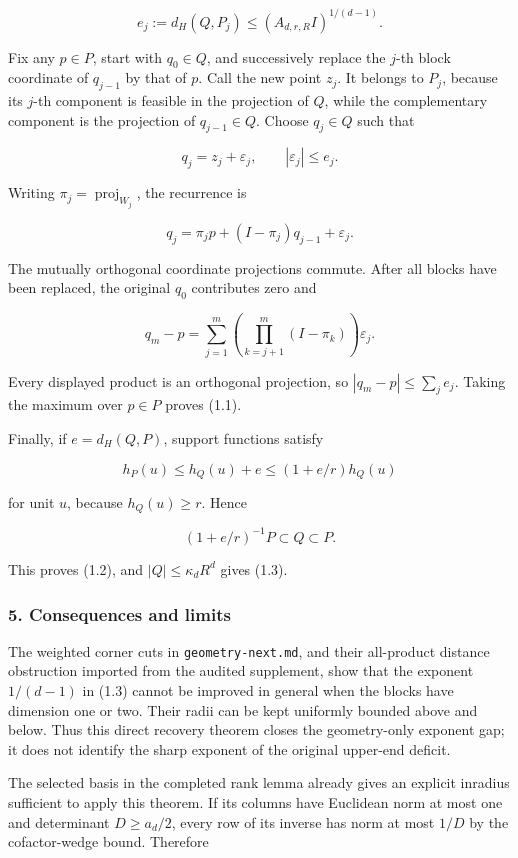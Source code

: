 \documentclass[
  11pt,
]{article}
\begin{document}
\[
 e_j:=d_H(Q,P_j)\le(A_{d,r,R}I)^{1/(d-1)}.            \tag{4.1}
\]

Fix any \(p\in P\), start with \(q_0\in Q\), and successively replace
the \(j\)-th block coordinate of \(q_{j-1}\) by that of \(p\). Call the
new point \(z_j\). It belongs to \(P_j\), because its \(j\)-th component
is feasible in the projection of \(Q\), while the complementary
component is the projection of \(q_{j-1}\in Q\). Choose \(q_j\in Q\)
such that

\[
 q_j=z_j+\varepsilon_j,\qquad |\varepsilon_j|\le e_j.
\]

Writing \(\pi_j=\operatorname{proj}_{W_j}\), the recurrence is

\[
 q_j=\pi_jp+(I-\pi_j)q_{j-1}+\varepsilon_j.
\]

The mutually orthogonal coordinate projections commute. After all blocks
have been replaced, the original \(q_0\) contributes zero and

\[
 q_m-p=\sum_{j=1}^m
       \left(\prod_{k=j+1}^m(I-\pi_k)\right)\varepsilon_j.
\]

Every displayed product is an orthogonal projection, so
\(|q_m-p|\le\sum_j e_j\). Taking the maximum over \(p\in P\) proves
(1.1).

Finally, if \(e=d_H(Q,P)\), support functions satisfy

\[
 h_P(u)\le h_Q(u)+e\le(1+e/r)h_Q(u)
\]

for unit \(u\), because \(h_Q(u)\ge r\). Hence

\[
 (1+e/r)^{-1}P\subset Q\subset P.
\]

This proves (1.2), and \(|Q|\le\kappa_dR^d\) gives (1.3).

\subsubsection{5. Consequences and
limits}\label{consequences-and-limits}

The weighted corner cuts in \texttt{geometry-next.md}, and their
all-product distance obstruction imported from the audited supplement,
show that the exponent \(1/(d-1)\) in (1.3) cannot be improved in
general when the blocks have dimension one or two. Their radii can be
kept uniformly bounded above and below. Thus this direct recovery
theorem closes the geometry-only exponent gap; it does not identify the
sharp exponent of the original upper-end deficit.

The selected basis in the completed rank lemma already gives an explicit
inradius sufficient to apply this theorem. If its columns have Euclidean
norm at most one and determinant \(D\ge a_d/2\), every row of its
inverse has norm at most \(1/D\) by the cofactor-wedge bound. Therefore
\end{document}
